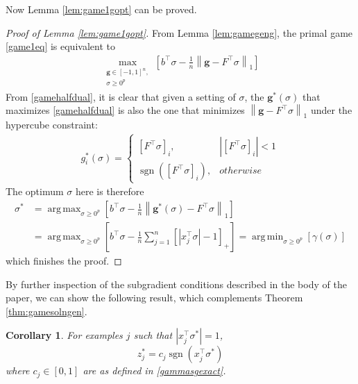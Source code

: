 \documentclass{colt2015} %
\newtheorem{cor}[thm]{Corollary}
\newcommand{\vg}{\mathbf{g}}
\DeclareMathOperator*{\argmin}{arg\,min}
\DeclareMathOperator*{\argmax}{arg\,max}
\DeclareMathOperator{\sgn}{sgn}
\newcommand{\vnorm}[1]{\left\lVert#1\right\rVert} %
\newcommand{\abs}[1]{\left| #1 \right|}
\begin{document}
Now Lemma \ref{lem:game1gopt} can be proved.
\begin{proof}[Proof of Lemma \ref{lem:game1gopt}]
From Lemma \ref{lem:gamegeng}, 
the primal game \eqref{game1eq} is equivalent to 
\begin{align}
\label{gamehalfdual}
\max_{\substack{ \vg \in [-1,1]^n, \\ \sigma \geq 0^p }} \left[ b^\top \sigma - \frac{1}{n} \vnorm{\vg - F^\top \sigma}_1 \right]
\end{align}
From \eqref{gamehalfdual}, 
it is clear that given a setting of $\sigma$, 
the $\vg^* (\sigma)$ that maximizes \eqref{gamehalfdual} 
is also the one that minimizes $\vnorm{\vg - F^\top \sigma}_1$ under the hypercube constraint:
\begin{align*}
g_i^* (\sigma) = \begin{cases} [ F^\top \sigma ]_{i}, & \abs{[F^\top \sigma ]_{i}} < 1 \\ 
\sgn([F^\top \sigma]_{i}), & otherwise \end{cases}
\end{align*}
The optimum $\sigma$ here is therefore
\begin{align*}
\sigma^* &= \argmax_{\sigma \geq 0^p} \left[ b^\top \sigma - \frac{1}{n} \vnorm{\vg^* (\sigma) - F^\top \sigma}_1 \right] \\
&= \argmax_{\sigma \geq 0^p} \left[ b^\top \sigma - \frac{1}{n} \sum_{j=1}^n \left[ \abs{x_{j}^\top \sigma} - 1 \right]_{+} \right] 
= \argmin_{\sigma \geq 0^p} [\gamma (\sigma)]
\end{align*}
which finishes the proof.
\end{proof}



By further inspection of the subgradient conditions described in the body of the paper, 
we can show the following result, which complements Theorem \ref{thm:gamesolngen}.
\begin{cor}
\label{cor:zoptfullpred}
For examples $j$ such that $\abs{x_j^\top \sigma^*} = 1$, 
$$ z_j^* = c_j \sgn(x_j^\top \sigma^*) $$
where $c_j \in [0,1]$ are as defined in \eqref{gammasgexact}.
\end{cor}



\end{document}

